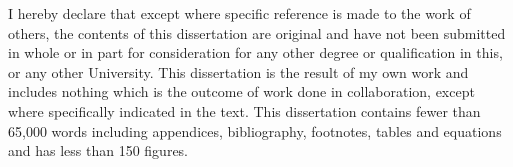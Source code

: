 
\begin{declaration}

I hereby declare that except where specific reference is made to the work of others, the contents of this dissertation are original and have not been submitted in whole or in part for consideration for any other degree or qualification in this, or any other University. This dissertation is the result of my own work and includes nothing which is the outcome of work done in collaboration, except where specifically indicated in the text. This dissertation contains fewer than 65,000 words including appendices, bibliography, footnotes, tables and equations and has less than 150 figures.


\end{declaration}

